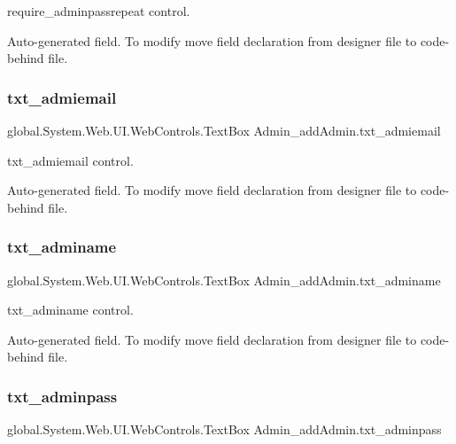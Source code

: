 require\+\_\+adminpassrepeat control. 

Auto-\/generated field. To modify move field declaration from designer file to code-\/behind file. \mbox{\label{class_admin__add_admin_ae757396c2c744a20a1b3b37794ca9d9b}} 
\subsubsection{\texorpdfstring{txt\_admiemail}{txt\_admiemail}}
{\footnotesize\ttfamily global.\+System.\+Web.\+U\+I.\+Web\+Controls.\+Text\+Box Admin\+\_\+add\+Admin.\+txt\+\_\+admiemail\hspace{0.3cm}{\ttfamily [protected]}}



txt\+\_\+admiemail control. 

Auto-\/generated field. To modify move field declaration from designer file to code-\/behind file. \mbox{\label{class_admin__add_admin_a989e7e48392b60b7d414188d08757ee4}} 
\subsubsection{\texorpdfstring{txt\_adminame}{txt\_adminame}}
{\footnotesize\ttfamily global.\+System.\+Web.\+U\+I.\+Web\+Controls.\+Text\+Box Admin\+\_\+add\+Admin.\+txt\+\_\+adminame\hspace{0.3cm}{\ttfamily [protected]}}



txt\+\_\+adminame control. 

Auto-\/generated field. To modify move field declaration from designer file to code-\/behind file. \mbox{\label{class_admin__add_admin_acdcfb7a0a9e36bc68036990de05a9cd8}} 
\subsubsection{\texorpdfstring{txt\_adminpass}{txt\_adminpass}}
{\footnotesize\ttfamily global.\+System.\+Web.\+U\+I.\+Web\+Controls.\+Text\+Box Admin\+\_\+add\+Admin.\+txt\+\_\+adminpass\hspace{0.3cm}{\ttfamily [protected]}}



